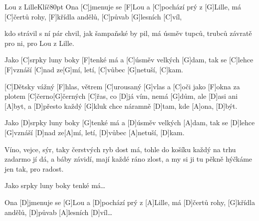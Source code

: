 \begin{song}{Lou z Lille}{Klíč}{80pt}
%
Ona [C]jmenuje se [F]Lou a [C]pochází prý z [G]Lille,
má [C]{}čertů rohy, [F]křídla andělů, [C]půvab [G]lesních [C]víl,

kdo strávil s ní pár chvil, jak šampaňské by pil,
má úsměv tupců, trubců závratě pro ni, pro Lou z Lille.

%
\rl Jako [C]srpky luny boky [F]tenké má a [C]{}úsměv velkých [G]dam,
tak se [C]lehce [F]vznáší [C]nad ze[G]mí, letí, [C]vůbec [G]netuší, [C]kam.\rr{}

\verse{*}%
[C]Dětsky vážný [F]hlas, větrem [C]urousaný [G]vlas
a [C]oči jako [F]okna za plotem [C]{}černo[G]{}černých [C]{}řas,
co [D]já vím, nemá [G]dům, ale [D]asi ani [A]byt,
a [D]přesto každý [G]kluk chce náramně [D]tam, kde [A]ona, [D]být.

%
\rl Jako [D]srpky luny boky [G]tenké má a [D]{}úsměv velkých [A]dam,
tak se [D]lehce [G]vznáší [D]nad ze[A]mí, letí, [D]vůbec [A]netuší, [D]kam.\rr{}

%
Víno, vejce, sýr, taky čerstvých ryb dost má,
tohle do košíku každý na trhu zadarmo jí dá,
a báby závidí, mají každé ráno zlost,
a my si ji tu pěkně hýčkáme jen tak, pro radost.

 Jako srpky luny boky tenké má\dots

\verse{*}%
Ona [D]jmenuje se [G]Lou a [D]pochází prý z [A]Lille,
má [D]{}čertů rohy, [G]křídla andělů, [D]půvab [A]lesních [D]víl\dots
\end{song}
